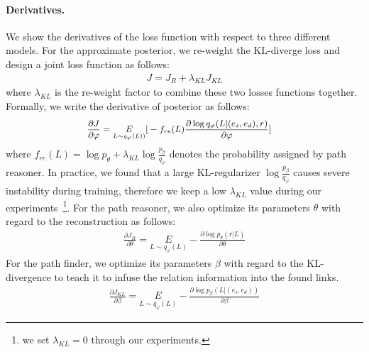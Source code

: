 \documentclass[11pt,a4paper]{article}
\newcommand{\expect}[1]{\underset{#1}{E}}
\begin{document}
\paragraph{Derivatives.} We show the derivatives of the loss function with respect to three different models. For the approximate posterior, we re-weight the KL-diverge loss and design a joint loss function as follows:
\begin{align}
J = J_R + \lambda_{KL} J_{KL}
\end{align}
where $\lambda_{KL}$ is the re-weight factor to combine these two losses functions together. Formally, we write the derivative of posterior as follows:
\begin{align}
\small
\begin{split}
\frac{\partial J}{\partial \varphi} =\expect{L \sim q_{\varphi}(L))}[& -f_{re}(L) \frac{\partial \log{q_{\varphi}(L| (e_s, e_d), r)}}{\partial \varphi}]
\end{split}
\label{eq:path-finder}
\end{align}
where $f_{re}(L) = \log{p_{\theta}} + \lambda_{KL} \log\frac{p_{\beta}}{q_{\varphi}}$ denotes the probability assigned by path reasoner. In practice, we found that a large KL-regularizer $\log \frac{p_{\beta}}{q_{\varphi}}$ causes severe instability during training, therefore we keep a low $\lambda_{KL}$ value during our experiments~\footnote{we set $\lambda_{KL}=0$ through our experiments.}.
For the path reasoner, we also optimize its parameters $\theta$ with regard to the reconstruction as follows:
\begin{align}
\frac{\partial J_R}{\partial \theta} = \expect{L \sim q_{\varphi}(L)} -\frac{\partial \log{p_{\theta}(r|L)}}{\partial \theta}
\label{eq:path-reasoner}
\end{align}
For the path finder, we optimize its parameters $\beta$ with regard to the KL-divergence to teach it to infuse the relation information into the found links.
\begin{align}
\frac{\partial J_{KL}}{\partial \beta} = \expect{L \sim q_{\varphi}(L)} -\frac{\partial \log{p_{\beta}(L|(e_s, e_d))}}{\partial \beta}
\label{eq:prior}
\end{align}
\end{document}
